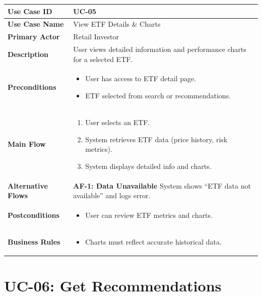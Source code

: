 \begin{longtable}{|>{\raggedright\arraybackslash\bfseries}p{3.5cm}|p{11cm}|}
\hline
\rowcolor{gray!15} Use Case ID & UC-05 \\ \hline
Use Case Name & View ETF Details \& Charts \\ \hline
Primary Actor & Retail Investor \\ \hline
Description & User views detailed information and performance charts for a selected ETF. \\ \hline
Preconditions &
\begin{itemize}[leftmargin=*, nosep]
    \item User has access to ETF detail page.
    \item ETF selected from search or recommendations.
\end{itemize} \\ \hline
Main Flow &
\begin{enumerate}[leftmargin=*, nosep]
    \item User selects an ETF.
    \item System retrieves ETF data (price history, risk metrics).
    \item System displays detailed info and charts.
\end{enumerate} \\ \hline
Alternative Flows &
\textbf{AF-1: Data Unavailable} \newline
System shows “ETF data not available” and logs error. \\ \hline
Postconditions &
\begin{itemize}[leftmargin=*, nosep]
    \item User can review ETF metrics and charts.
\end{itemize} \\ \hline
Business Rules &
\begin{itemize}[leftmargin=*, nosep]
    \item Charts must reflect accurate historical data.
\end{itemize} \\ \hline
\end{longtable}

\section{UC-06: Get Recommendations}
\label{uc:recommendations}

